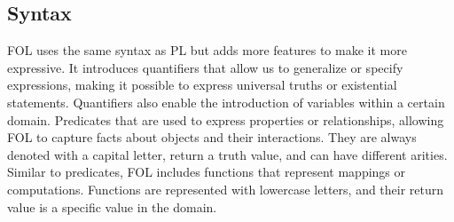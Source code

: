 \subsection{Syntax}
\gls{FOL} uses the same syntax as \gls{PL} but adds more features to make it more expressive. It introduces quantifiers that allow us to generalize or specify expressions, making it possible to express universal truths or existential statements. Quantifiers also enable the introduction of variables within a certain domain. Predicates that are used to express properties or relationships, allowing \gls{FOL} to capture facts about objects and their interactions. They are always denoted with a capital letter, return a truth value, and can have different arities. Similar to predicates, \gls{FOL} includes functions that represent mappings or computations. Functions are represented with lowercase letters, and their return value is a specific value in the domain.

\begin{table}[h!]
    \centering
    \caption{Examples of variables, constants, predicates, and functions in \gls{FOL}}
    \label{tab:pred_var_const_fun}
\end{table}

\begin{table}[h!]
    \centering
    \caption{Quantifiers in \gls{FOL}}
    \label{tab:quant}
\end{table}

